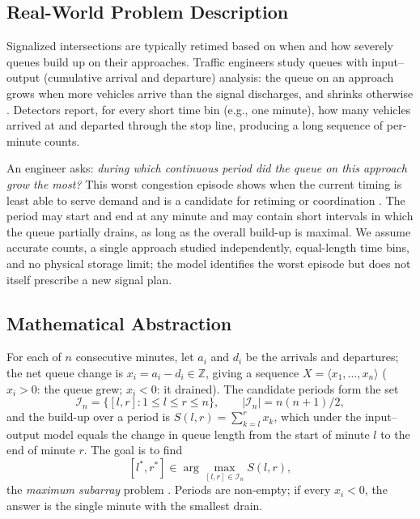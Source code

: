 \subsection{Real-World Problem Description}

Signalized intersections are typically retimed based on
when and how severely queues build up on their
approaches. Traffic engineers study queues with
input--output (cumulative arrival and departure)
analysis: the queue on an approach grows when more
vehicles arrive than the signal discharges, and shrinks
otherwise \cite{daganzo1997, hcm2022}. Detectors report,
for every short time bin (e.g., one minute), how many
vehicles arrived at and departed through the stop line,
producing a long sequence of per-minute counts.

An engineer asks: \emph{during which continuous period
did the queue on this approach grow the most?} This
worst congestion episode shows when the current timing
is least able to serve demand and is a candidate for
retiming or coordination \cite{fhwa2008}. The period
may start and end at any minute and may contain short
intervals in which the queue partially drains, as long
as the overall build-up is maximal. We assume accurate
counts, a single approach studied independently,
equal-length time bins, and no physical storage limit;
the model identifies the worst episode but does not
itself prescribe a new signal plan.

\subsection{Mathematical Abstraction}

For each of $n$ consecutive minutes, let $a_i$ and $d_i$
be the arrivals and departures; the net queue change is
$x_i = a_i - d_i \in \mathbb{Z}$, giving a sequence
$X = \langle x_1, \ldots, x_n \rangle$ ($x_i > 0$: the
queue grew; $x_i < 0$: it drained). The candidate
periods form the set
\[
\mathcal{I}_n = \{ [l, r] : 1 \le l \le r \le n \},
\qquad |\mathcal{I}_n| = n(n+1)/2,
\]
and the build-up over a period is
$S(l, r) = \sum_{k=l}^{r} x_k$, which under the
input--output model equals the change in queue length
from the start of minute $l$ to the end of minute $r$.
The goal is to find
\[
[l^*, r^*] \in \arg\max_{[l,r] \in \mathcal{I}_n} S(l, r),
\]
the \emph{maximum subarray} problem
\cite{bentley1984, clrs2009}. Periods are non-empty; if
every $x_i < 0$, the answer is the single minute with
the smallest drain.
